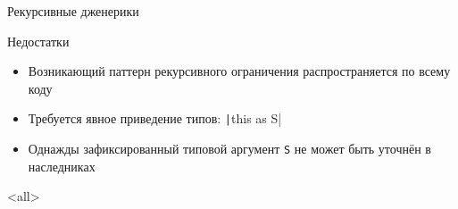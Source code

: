 \documentclass[handout,aspectratio=169,usenames,dvipsnames]{beamer}
\begin{document}
\begin{frame}[fragile]{Рекурсивные дженерики}
        \pause

        \begin{block}{Недостатки}
            \begin{itemize}
                \item Возникающий паттерн рекурсивного ограничения распространяется по всему коду
                \item Требуется явное приведение типов: \texttt|this as S|
                \item Однажды зафиксированный типовой аргумент \texttt{S} не может быть уточнён в наследниках
            \end{itemize}
        \end{block}
    \end{frame}
    \mode*

    \mode<all>
\end{document}
